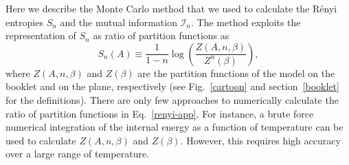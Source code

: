 \documentclass[twocolumn,superscriptaddress,prb,10pt]{revtex4-1}
\begin{document}
Here we describe the Monte Carlo method that we used to calculate the R\'enyi entropies 
$S_n$ and the mutual information ${\mathcal I}_n$. The method exploits the representation 
of $S_n$ as ratio of partition functions as 
%
\begin{equation}
\label{renyi-app}
S_n(A)\equiv \frac{1}{1-n}\log\left(\frac{Z(A,n,\beta)}{Z^n(\beta)}\right),
\end{equation}
%
where $Z(A,n,\beta)$ and $Z(\beta)$ are the partition functions of the model on the booklet and 
on the plane, respectively (see Fig.~\ref{cartoon} and section~\ref{booklet} for the definitions).  
There are only few approaches to numerically calculate the ratio of partition functions in 
Eq.~\eqref{renyi-app}. For instance, a brute force numerical integration of the internal energy as 
a function of temperature\cite{jaconis-2013} can be used to calculate $Z(A,n,\beta)$ and $Z(\beta)$. 
However, this requires high accuracy over a large range of temperature.
\end{document}

